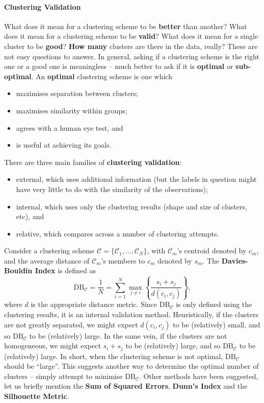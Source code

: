 \paragraph{Clustering Validation} 
What does it mean for a clustering scheme to be \textbf{better} than another? What does it mean for a clustering scheme to be \textbf{valid}? What does it mean for a single cluster to be \textbf{good}? \textbf{How many} clusters are there in the data, really? These are not easy questions to answer. In general, asking if a clustering scheme is the right one or a good one is meaningless -- much better to ask if it is \textbf{optimal} or \textbf{sub-optimal}.\newl 
An \textbf{optimal} clustering scheme is one which 
\begin{itemize}[noitemsep]
\item maximises separation between clusters;
\item maximises similarity within groups;
\item agrees with a human eye test, and 
\item is useful at achieving its goals.
\end{itemize}
There are three main families of \textbf{clustering validation}:
\begin{itemize}[noitemsep]
\item external, which uses additional information (but the labels in question might have very little to do with the similarity of the observations);
\item internal, which uses only the clustering results (shape and size of clusters, etc), and
\item relative, which compares across a number of clustering attempts.
\end{itemize}
Consider a clustering scheme $\mathcal{C}=\{\mathcal{C}_1,\ldots,\mathcal{C}_N\}$, with $\mathcal{C}_m$'s centroid denoted by $c_m$, and the average distance of $\mathcal{C}_m$'s members to $c_m$ denoted by $s_m$.  
The \textbf{Davies-Bouldin Index} is defined as $$\textrm{DB}_{\mathcal{C}}=\frac{1}{N}=\sum_{i=1}^N \max_{j\neq i}\left\{\frac{s_i+s_j}{d(c_i,c_j)}\right\},$$ where $d$ is the appropriate distance metric. Since $\textrm{DB}_{\mathcal{C}}$ is only defined using the clustering results, it is an internal validation method. Heuristically, if the clusters are not greatly separated, we might expect $d(c_i,c_j)$ to be (relatively) small, and so $\textrm{DB}_{\mathcal{C}}$ to be (relatively) large. In the same vein, if the clusters are not homogeneous, we might expect $s_i+s_j$ to be (relatively) large, and so $\textrm{DB}_{\mathcal{C}}$ to be (relatively) large. In short, when the clustering scheme is not optimal, $\textrm{DB}_{\mathcal{C}}$ should be ``large''. This suggests another way to determine the optimal number of clusters -- simply attempt to minimise $\textrm{DB}_{\mathcal{C}}$. Other methods have been suggested, let us briefly mention the \textbf{Sum of Squared Errors}, \textbf{Dunn's Index} and the \textbf{Silhouette Metric}. 
